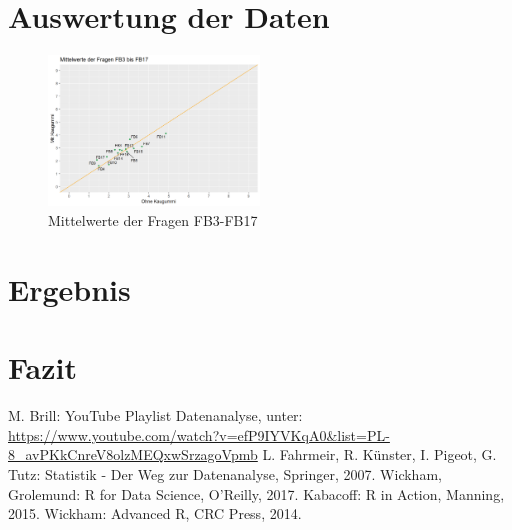 \documentclass[conference, 12pt]{IEEEtran}
\begin{document}
\section{Auswertung der Daten}




\begin{figure}
	\centering
	\includegraphics[width=0.5\textwidth]{Mittelwert3-17.png}
	\caption{Mittelwerte der Fragen FB3-FB17}
	\label{img:mittelwerte}
\end{figure}



\section{Ergebnis}



\section{Fazit}



\begin{thebibliography}{00}
 M. Brill: YouTube Playlist Datenanalyse, unter: {\url{https://www.youtube.com/watch?v=efP9IYVKqA0&list=PL-8_avPKkCnreV8olzMEQxwSrzagoVpmb}}
 L. Fahrmeir, R. Künster, I. Pigeot, G. Tutz: Statistik - Der Weg zur Datenanalyse, Springer, 2007.
 Wickham, Grolemund: R for Data Science, O'Reilly, 2017.
 Kabacoff: R in Action, Manning, 2015.
 Wickham: Advanced R, CRC Press, 2014.
\end{thebibliography}
\end{document}
